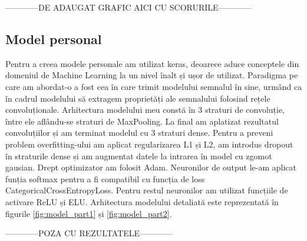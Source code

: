 ------------DE ADAUGAT GRAFIC AICI CU SCORURILE------------

\subsection{Model personal}
Pentru a creea modele personale am utilizat keras, deoarece aduce conceptele din domeniul de Machine Learning la un nivel înalt și ușor de utilizat. Paradigma pe care am abordat-o a fost cea în care trimit modelului semnalul în sine, urmând ca în cadrul modelului să extragem proprietăți ale semnalului folosind rețele convoluționale. Arhitectura modelului meu constă în 3 straturi de convoluție, între ele aflându-se straturi de MaxPooling. La final am aplatizat rezultatul convoluțiilor și am terminat modelul cu 3 straturi dense. Pentru a preveni problem overfitting-ului am aplicat regularizarea L1 și L2, am introdus dropout în straturile dense și am augmentat datele la intrarea în model cu zgomot gausian. Drept optimizator am folosit Adam. Neuronilor de output le-am aplicat funția softmax pentru a fi compatibil cu funcția de loss CategoricalCrossEntropyLoss. Pentru restul neuronilor am utilizat funcțiile de activare ReLU și ELU. Arhitectura modelului detaliată este reprezentată în figurile \ref{fig:model_part1} și \ref{fig:model_part2}.

------------POZA CU REZULTATELE------------